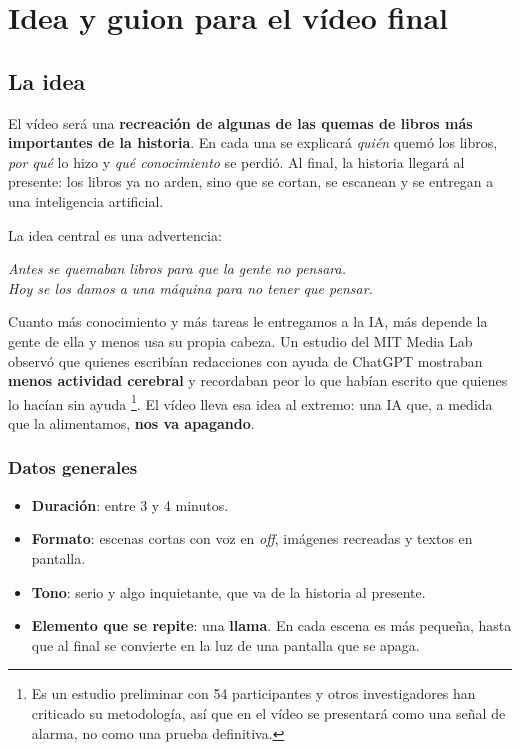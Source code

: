 \chapter{Idea y guion para el vídeo final}

\section{La idea}

El vídeo será una \textbf{recreación de algunas de las quemas de libros más
importantes de la historia}. En cada una se explicará \emph{quién} quemó los
libros, \emph{por qué} lo hizo y \emph{qué conocimiento} se perdió. Al final, la
historia llegará al presente: los libros ya no arden, sino que se cortan, se
escanean y se entregan a una inteligencia artificial.

La idea central es una advertencia:

\begin{center}
  \large\textit{Antes se quemaban libros para que la gente no pensara.\\
  Hoy se los damos a una máquina para no tener que pensar.}
\end{center}

Cuanto más conocimiento y más tareas le entregamos a la IA, más depende la
gente de ella y menos usa su propia cabeza. Un estudio del MIT Media Lab
observó que quienes escribían redacciones con ayuda de ChatGPT mostraban
\textbf{menos actividad cerebral} y recordaban peor lo que habían escrito que
quienes lo hacían sin ayuda \cite{kosmyna2025}\footnote{Es un estudio preliminar
con 54 participantes y otros investigadores han criticado su metodología, así que
en el vídeo se presentará como una señal de alarma, no como una prueba
definitiva.}. El vídeo lleva esa idea al extremo: una IA que, a medida que la
alimentamos, \textbf{nos va apagando}.

\subsection{Datos generales}

\begin{itemize}
  \item \textbf{Duración}: entre 3 y 4 minutos.
  \item \textbf{Formato}: escenas cortas con voz en \textit{off}, imágenes
        recreadas y textos en pantalla.
  \item \textbf{Tono}: serio y algo inquietante, que va de la historia al
        presente.
  \item \textbf{Elemento que se repite}: una \textbf{llama}. En cada escena es
        más pequeña, hasta que al final se convierte en la luz de una pantalla
        que se apaga.
\end{itemize}

